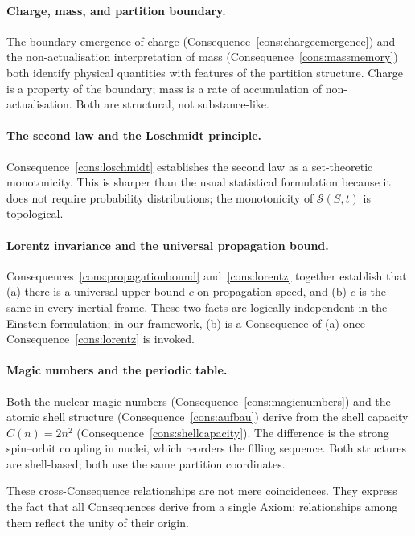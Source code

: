 \documentclass[11pt,twocolumn,a4paper]{article}
\theoremstyle{axiomstyle}
\theoremstyle{conseqstyle}
\theoremstyle{definition}
\theoremstyle{remark}
\newcommand{\Sspace}{\mathcal{S}}
\begin{document}
\paragraph{Charge, mass, and partition boundary.} The boundary emergence of charge (Consequence~\ref{cons:chargeemergence}) and the non-actualisation interpretation of mass (Consequence~\ref{cons:massmemory}) both identify physical quantities with features of the partition structure. Charge is a property of the boundary; mass is a rate of accumulation of non-actualisation. Both are structural, not substance-like.

\paragraph{The second law and the Loschmidt principle.} Consequence~\ref{cons:loschmidt} establishes the second law as a set-theoretic monotonicity. This is sharper than the usual statistical formulation because it does not require probability distributions; the monotonicity of $\Sspace(S,t)$ is topological.

\paragraph{Lorentz invariance and the universal propagation bound.} Consequences~\ref{cons:propagationbound} and~\ref{cons:lorentz} together establish that (a) there is a universal upper bound $c$ on propagation speed, and (b) $c$ is the same in every inertial frame. These two facts are logically independent in the Einstein formulation; in our framework, (b) is a Consequence of (a) once Consequence~\ref{cons:lorentz} is invoked.

\paragraph{Magic numbers and the periodic table.} Both the nuclear magic numbers (Consequence~\ref{cons:magicnumbers}) and the atomic shell structure (Consequence~\ref{cons:aufbau}) derive from the shell capacity $C(n)=2n^{2}$ (Consequence~\ref{cons:shellcapacity}). The difference is the strong spin--orbit coupling in nuclei, which reorders the filling sequence. Both structures are shell-based; both use the same partition coordinates.

These cross-Consequence relationships are not mere coincidences. They express the fact that all Consequences derive from a single Axiom; relationships among them reflect the unity of their origin.
\end{document}
